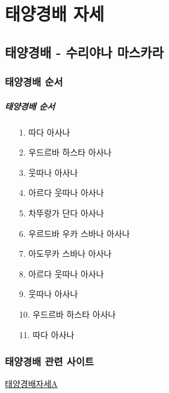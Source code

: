 \documentclass[12pt, a4paper, oneside]{book}
\let\stdsection\section
\renewcommand\section{\newpage\stdsection}
\begin{document}
	\chapter{태양경배 자세}
	\newpage
	\minitoc

	\newpage
	\section{태양경배 - 수리야나 마스카라}


		\subsection{태양경배 순서}


			\paragraph{태양경배 순서}
			\begin{itemize}[topsep=0.0em, parsep=0.0em, itemsep=0em, leftmargin=12.0em, labelwidth=3em, labelsep=3em] 
			\item [1.] 	따다 아사나
			\item [2.] 	우드르바 하스타 아사나
			\item [3.] 	웃따나 아사나
			\item [4.] 	아르다 웃따나 아사나
			\item [5.] 	차뚜랑가 단다 아사나
			\item [6.] 	우르드바 우카 스바나 아사나
			\item [7.] 	아도무카 스바나 아사나
			\item [8.] 	아르다 웃따나 아사나
			\item [9.] 	웃따나 아사나
			\item [10.] 	우드르바 하스타 아사나
			\item [11.] 	따다 아사나
			\end{itemize}

		\subsection{태양경배 관련 사이트}
		
			\href{https://www.youtube.com/watch?v=SpqKCQZQBcc}{태양경배자세A}
\end{document}
